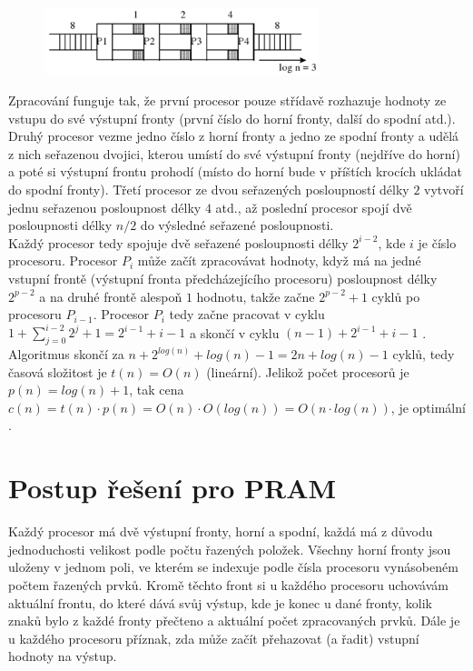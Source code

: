 \documentclass[11pt,a4paper]{article}
\begin{document}
\begin{figure}[ht]
	\begin{center}
		\includegraphics[width=8cm,keepaspectratio]{example}
	\end{center}
\end{figure}

\noindent
Zpracování funguje tak, že první procesor pouze střídavě rozhazuje hodnoty ze
vstupu do své výstupní fronty (první číslo do horní fronty, další do spodní atd.).
Druhý procesor vezme jedno číslo z horní fronty a jedno ze spodní fronty
a udělá z nich seřazenou dvojici, kterou umístí do své výstupní fronty (nejdříve do horní)
a poté si výstupní frontu prohodí (místo do horní bude v příštích krocích ukládat do spodní fronty).
Třetí procesor ze dvou seřazených posloupností délky $2$ vytvoří jednu seřazenou
posloupnost délky $4$ atd., až poslední procesor spojí dvě posloupnosti
délky $n / 2$ do výsledné seřazené posloupnosti. \\

\noindent
Každý procesor tedy spojuje dvě seřazené posloupnosti délky $2^{i-2}$, kde
$i$ je číslo procesoru. Procesor $P_{i}$ může začít zpracovávat hodnoty, když
má na jedné vstupní frontě (výstupní fronta předcházejícího procesoru)
posloupnost délky $2^{p-2}$ a na druhé frontě alespoň $1$ hodnotu, takže
začne $2^{p-2}+1$ cyklů po procesoru $P_{i-1}$.
Procesor $P_{i}$ tedy začne pracovat v cyklu $1 + \sum^{i-2}_{j=0}2^{j} + 1 = 2^{i-1} + i - 1$
a skončí v cyklu $(n - 1) + 2^{i-1} + i - 1$ \cite{1}. \\

\noindent
Algoritmus skončí za $n + 2^{log(n)} + log(n) - 1 = 2n + log(n) - 1$ cyklů, tedy
časová složitost je $t(n) = O(n)$ (lineární). Jelikož počet procesorů
je $p(n) = log(n) + 1$, tak cena $c(n) = t(n)\cdot p(n) = O(n)\cdot O(log(n)) = O(n\cdot log(n))$,
je optimální \cite{1}.

\section{Postup řešení pro PRAM}

Každý procesor má dvě výstupní fronty, horní a spodní, každá má z důvodu jednoduchosti
velikost podle počtu řazených položek. Všechny horní fronty jsou uloženy v jednom
poli, ve kterém se indexuje podle čísla procesoru vynásobeném počtem řazených prvků.
Kromě těchto front si u každého procesoru uchovávám aktuální frontu, do které
dává svůj výstup, kde je konec u dané fronty, kolik znaků bylo z každé fronty
přečteno a aktuální počet zpracovaných prvků. Dále je u každého procesoru příznak,
zda může začít přehazovat (a řadit) vstupní hodnoty na výstup. \\
\end{document}
